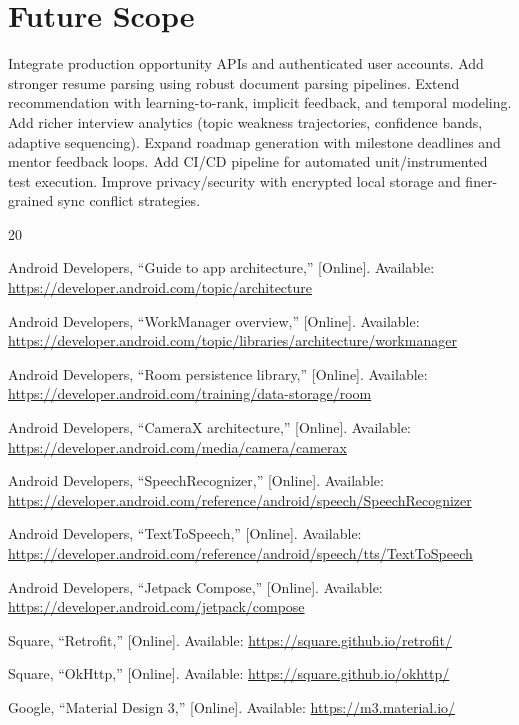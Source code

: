 \documentclass[conference]{IEEEtran}
\begin{document}
\section{Future Scope}

Integrate production opportunity APIs and authenticated user accounts. Add stronger resume parsing using robust document parsing pipelines. Extend recommendation with learning-to-rank, implicit feedback, and temporal modeling. Add richer interview analytics (topic weakness trajectories, confidence bands, adaptive sequencing). Expand roadmap generation with milestone deadlines and mentor feedback loops. Add CI/CD pipeline for automated unit/instrumented test execution. Improve privacy/security with encrypted local storage and finer-grained sync conflict strategies.

\FloatBarrier
\begin{thebibliography}{20}

 Android Developers, ``Guide to app architecture,'' [Online]. Available: \url{https://developer.android.com/topic/architecture}

 Android Developers, ``WorkManager overview,'' [Online]. Available: \url{https://developer.android.com/topic/libraries/architecture/workmanager}

 Android Developers, ``Room persistence library,'' [Online]. Available: \url{https://developer.android.com/training/data-storage/room}

 Android Developers, ``CameraX architecture,'' [Online]. Available: \url{https://developer.android.com/media/camera/camerax}

 Android Developers, ``SpeechRecognizer,'' [Online]. Available: \url{https://developer.android.com/reference/android/speech/SpeechRecognizer}

 Android Developers, ``TextToSpeech,'' [Online]. Available: \url{https://developer.android.com/reference/android/speech/tts/TextToSpeech}

 Android Developers, ``Jetpack Compose,'' [Online]. Available: \url{https://developer.android.com/jetpack/compose}

 Square, ``Retrofit,'' [Online]. Available: \url{https://square.github.io/retrofit/}

 Square, ``OkHttp,'' [Online]. Available: \url{https://square.github.io/okhttp/}

 Google, ``Material Design 3,'' [Online]. Available: \url{https://m3.material.io/}


\end{thebibliography}
\end{document}
